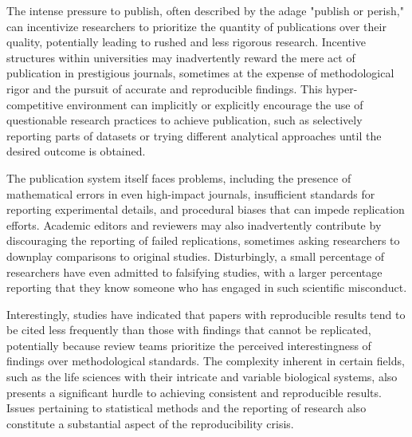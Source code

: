 \documentclass{article}
\begin{document}
The intense pressure to publish, often described by the adage "publish or perish," can incentivize researchers to prioritize the quantity of publications over their quality, potentially leading to rushed and less rigorous research. Incentive structures within universities may inadvertently reward the mere act of publication in prestigious journals, sometimes at the expense of methodological rigor and the pursuit of accurate and reproducible findings. This hyper-competitive environment can implicitly or explicitly encourage the use of questionable research practices to achieve publication, such as selectively reporting parts of datasets or trying different analytical approaches until the desired outcome is obtained.

The publication system itself faces problems, including the presence of mathematical errors in even high-impact journals, insufficient standards for reporting experimental details, and procedural biases that can impede replication efforts. Academic editors and reviewers may also inadvertently contribute by discouraging the reporting of failed replications, sometimes asking researchers to downplay comparisons to original studies. Disturbingly, a small percentage of researchers have even admitted to falsifying studies, with a larger percentage reporting that they know someone who has engaged in such scientific misconduct.

Interestingly, studies have indicated that papers with reproducible results tend to be cited less frequently than those with findings that cannot be replicated, potentially because review teams prioritize the perceived interestingness of findings over methodological standards. The complexity inherent in certain fields, such as the life sciences with their intricate and variable biological systems, also presents a significant hurdle to achieving consistent and reproducible results. Issues pertaining to statistical methods and the reporting of research also constitute a substantial aspect of the reproducibility crisis.
\end{document}
